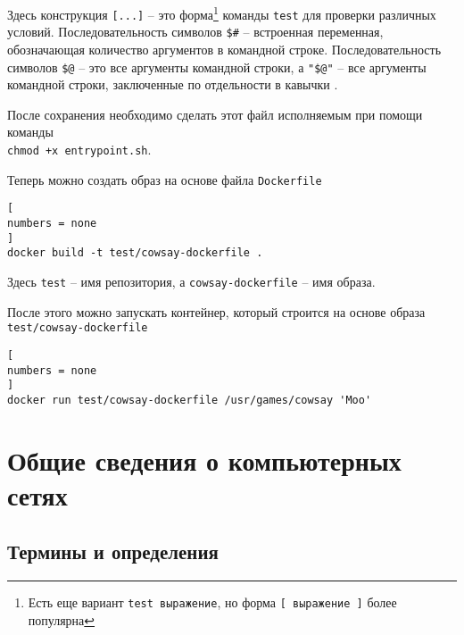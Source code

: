 \documentclass[%
	11pt,
	a4paper,
	utf8,
		]{article}
\begin{document}
Здесь конструкция \texttt{[...]} -- это форма\footnote{Есть еще вариант \texttt{test выражение}, но форма \texttt{[ выражение ]} более популярна} команды \texttt{test} для проверки различных условий. Последовательность символов \texttt{\$\#} -- встроенная переменная, обозначающая количество аргументов в командной строке. Последовательность символов \texttt{\$@} -- это все аргументы командной строки, а \texttt{"\$@"} -- все аргументы командной строки, заключенные по отдельности в кавычки \cite[]{robbins:bash-2017}.

После сохранения необходимо сделать этот файл исполняемым при помощи команды\\ \texttt{chmod +x entrypoint.sh}.

Теперь можно создать образ на основе файла \texttt{Dockerfile}
\begin{lstlisting}[
numbers = none
]
docker build -t test/cowsay-dockerfile .
\end{lstlisting}

Здесь \texttt{test} -- имя репозитория, а \texttt{cowsay-dockerfile} -- имя образа.

После этого можно запускать контейнер, который строится на основе образа \verb|test/cowsay-dockerfile|
\begin{lstlisting}[
numbers = none
]
docker run test/cowsay-dockerfile /usr/games/cowsay 'Moo'
\end{lstlisting}



\section{Общие сведения о компьютерных сетях}

\subsection{Термины и определения}
\end{document}
